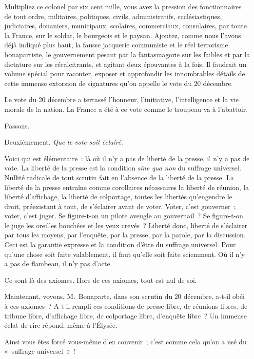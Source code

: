 \documentclass[french,twoside]{book} %
\begin{document}
\noindent Multipliez ce colonel par six cent mille, vous avez la pression des fonctionnaires de tout ordre, militaires, politiques, civils, administratifs, ecclésiastiques, judiciaires, douaniers, municipaux, scolaires, commerciaux, consulaires, par toute la France, sur le soldat, le bourgeois et le paysan. Ajoutez, comme nous l’avons déjà indiqué plus haut, la fausse jacquerie communiste et le réel terrorisme bonapartiste, le gouvernement pesant par la fantasmagorie sur les faibles et par la dictature sur les récalcitrants, et agitant deux épouvantes à la fois. Il faudrait un volume spécial pour raconter, exposer et approfondir les innombrables détails de cette immense extorsion de signatures qu’on appelle le vote du 20 décembre.\par
Le vote du 20 décembre a terrassé l’honneur, l’initiative, l’intelligence et la vie morale de la nation. La France a été à ce vote comme le troupeau va à l’abattoir.\par
Passons.\par
Deuxièmement. \emph{Que le vote soit éclairé.}\par
Voici qui est élémentaire : là où il n’y a pas de liberté de la presse, il n’y a pas de vote. La liberté de la presse est la condition \emph{sine qua non} du suffrage universel. Nullité radicale de tout scrutin fait en l’absence de la liberté de la presse. La liberté de la presse entraîne comme corollaires nécessaires la liberté de réunion, la liberté d’affichage, la liberté de colportage, toutes les libertés qu’engendre le droit, préexistant à tout, de s’éclairer avant de voter. Voter, c’est gouverner ; voter, c’est juger. Se figure-t-on un pilote aveugle au gouvernail ? Se figure-t-on le juge les oreilles bouchées et les yeux crevés ? Liberté donc, liberté de s’éclairer par tous les moyens, par l’enquête, par la presse, par la parole, par la discussion. Ceci est la garantie expresse et la condition d’être du suffrage universel. Pour qu’une chose soit faite valablement, il faut qu’elle soit faite sciemment. Où il n’y a pas de flambeau, il n’y pas d’acte.\par
Ce sont là des axiomes. Hors de ces axiomes, tout est nul de soi.\par
Maintenant, voyons. M. Bonaparte, dans son scrutin du 20 décembre, a-t-il obéi à ces axiomes ? A-t-il rempli ces conditions de presse libre, de réunions libres, de tribune libre, d’affichage libre, de colportage libre, d’enquête libre ? Un immense éclat de rire répond, même à l’Élysée.\par
Ainsi vous êtes forcé vous-même d’en convenir ; c’est comme cela qu’on a usé du « suffrage universel » !\par
\end{document}
